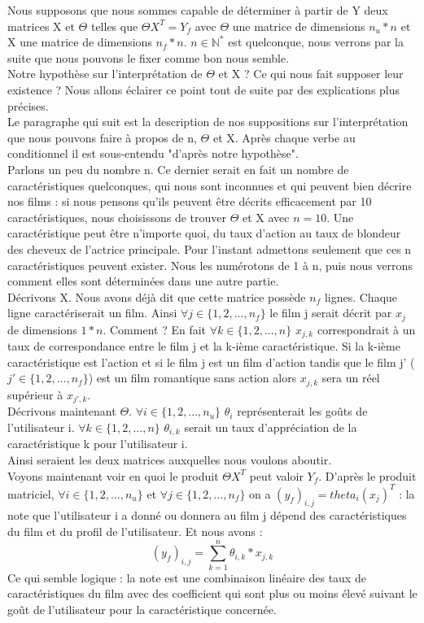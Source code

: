 \documentclass[a4paper,10pt]{article}
\begin{document}
Nous supposons que nous sommes capable de déterminer à partir de Y deux matrices X et $\Theta$ telles que $\Theta X^T = Y_f$ avec $\Theta$ une matrice de dimensions $n_u * n$ et X une matrice de dimensions $n_f * n$. $n \in \mathbb{N}^*$ est quelconque, nous verrons par la suite que nous pouvons le fixer comme bon nous semble.\\ 
Notre hypothèse sur l'interprétation de $\Theta$ et X ? Ce qui nous fait supposer leur existence ? Nous allons éclairer ce point tout de suite par des explications plus précises.\\

Le paragraphe qui suit est la description de nos suppositions sur l'interprétation que nous pouvons faire à propos de n, $\Theta$ et X. Après chaque verbe au conditionnel il est sous-entendu "d'après notre hypothèse".\\
Parlons un peu du nombre n. Ce dernier serait en fait un nombre de caractéristiques quelconques, qui nous sont inconnues et qui peuvent bien décrire nos films : si nous pensons qu'ils peuvent être décrits efficacement par 10 caractéristiques, nous choisissons de trouver $\Theta$ et X avec $n = 10$. 
Une caractéristique peut être n'importe quoi, du taux d'action au taux de blondeur des cheveux de l'actrice principale. Pour l'instant admettons seulement que ces n caractéristiques peuvent exister. Nous les numérotons de 1 à n, puis nous verrons comment elles sont déterminées dans une autre partie.\\
Décrivons X. Nous avons déjà dit que cette matrice possède $n_f$ lignes. Chaque ligne caractériserait un film. Ainsi $\forall j \in \{1, 2, ..., n_f\}$ le film j serait décrit par $x_j$ de dimensions $1 * n$. Comment ? En fait $\forall k \in \{1, 2, ..., n\}$ $x_{j,k}$ correspondrait à un taux de correspondance entre le film j et la k-ième caractéristique. Si la k-ième caractéristique est l'action et si le film j est un film d'action tandis que le film j' ($j' \in \{1, 2, ..., n_f\}$) est un film romantique sans action alors $x_{j,k}$ sera un réel supérieur à $x_{j',k}$.\\
Décrivons maintenant $\Theta$. $\forall i \in \{1, 2, ..., n_u\}$ $\theta_{i}$ représenterait les goûts de l'utilisateur i. $\forall k \in \{1, 2, ..., n\}$ $\theta_{i,k}$ serait un taux d'appréciation de la caractéristique k pour l'utilisateur i.\\
Ainsi seraient les deux matrices auxquelles nous voulons aboutir.\\

Voyons maintenant voir en quoi le produit $\Theta X^T$ peut valoir $Y_f$. D'après le produit matriciel, $\forall i \in \{1, 2, ..., n_u\}$ et $\forall j \in \{1, 2, ..., n_f\}$ on a $(y_{f})_{i,j} = theta_{i}(x_{j})^{T}$ : la note que l'utilisateur i a donné ou donnera au film j dépend des caractéristiques du film et du profil de l'utilisateur. Et nous avons :
\[(y_{f})_{i,j} = \sum_{k = 1}^{n} \theta_{i,k} * x_{j,k}\]
Ce qui semble logique : la note est une combinaison linéaire des taux de caractéristiques du film avec des coefficient qui sont plus ou moins élevé suivant le goût de l'utilisateur pour la caractéristique concernée.
\end{document}
